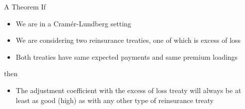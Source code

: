 \documentclass[11pt]{beamer}
\begin{document}
\begin{frame}{A Theorem}
If
\begin{itemize}
\item We are in a Cram\'er-Lundberg setting
\item We are considering two reinsurance treaties, one of which is excess of loss
\item Both treaties have same expected payments and same premium loadings
\end{itemize}
then
\begin{itemize}
\item The adjustment coefficient with the excess of loss treaty will always be \alert{at least as good (high) as with any other type of reinsurance treaty}
\end{itemize}

\end{frame}
\end{document}

